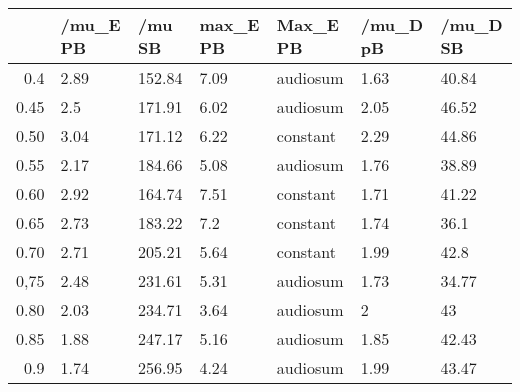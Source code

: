 \begin{table}[ht]
\centering
\begin{tabular}{rllllll}
  \hline
 & /mu\_E PB & /mu SB & max\_E PB & Max\_E PB & /mu\_D pB & /mu\_D SB \\ 
  \hline
0.4 & 2.89 & 152.84 & 7.09 & audiosum & 1.63 & 40.84 \\ 
  0.45 & 2.5 & 171.91 & 6.02 & audiosum & 2.05 & 46.52 \\ 
  0.50 & 3.04 & 171.12 & 6.22 & constant & 2.29 & 44.86 \\ 
  0.55 & 2.17 & 184.66 & 5.08 & audiosum & 1.76 & 38.89 \\ 
  0.60 & 2.92 & 164.74 & 7.51 & constant & 1.71 & 41.22 \\ 
  0.65 & 2.73 & 183.22 & 7.2 & constant & 1.74 & 36.1 \\ 
  0.70 & 2.71 & 205.21 & 5.64 & constant & 1.99 & 42.8 \\ 
  0,75 & 2.48 & 231.61 & 5.31 & audiosum & 1.73 & 34.77 \\ 
  0.80 & 2.03 & 234.71 & 3.64 & audiosum & 2 & 43 \\ 
  0.85 & 1.88 & 247.17 & 5.16 & audiosum & 1.85 & 42.43 \\ 
  0.9 & 1.74 & 256.95 & 4.24 & audiosum & 1.99 & 43.47 \\ 
   \hline
\end{tabular}
\end{table}
